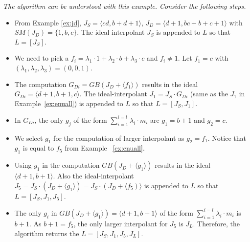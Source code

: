 \begin{Example}
\label{ex:chainofinter}
{\it
The algorithm can be understood with this example. Consider the following steps.
\begin{itemize}
	\item From Example \ref{ex:jd}, $J_S = \langle cd, b + d+ 1 \rangle$,
	$J_D = \langle d+1,bc+b+c+1 \rangle$ with $SM(J_D) = \{1,b,c\}$. The ideal-interpolant $J_S$
	is appended to $L$ so that $L = [J_S]$.
	
	\item We need to pick a $f_i = \lambda_1\cdot 1 + \lambda_2\cdot b + \lambda_3\cdot c$ and
	$f_i \neq 1$. Let $f_1 = c$ with $(\lambda_1,\lambda_2,\lambda_3) = (0,0,1)$.
	
	\item The computation $G_{Di} = GB(J_D + \langle f_1 \rangle)$ results in the ideal
	$G_{Di} = \langle d+1,b+1,c \rangle$. The ideal-interpolant $J_1 = J_S \cdot G_{Di}$ 
	(same as the $J_1$ in Example~\ref{ex:enuall}) is appended to 
	$L$ so that $L = [J_S,J_1]$.
	
	\item In $G_{Di}$, the only $g_j$ of the form $\sum_{i=1}^{i=l} \lambda_i \cdot m_i$ are
	$g_1 = b+1$ and $g_2 = c$. 

	\item We select $g_1$ for the computation of larger interpolant as $g_2 = f_1$. Notice that $g_1$ is equal to $f_5$ from Example ~\ref{ex:enuall}.
	
	\item Using $g_1$ in the computation $GB(J_D + \langle g_1 \rangle)$ results in the
	ideal $\langle d+1, b+1\rangle$. Also the ideal-interpolant $J_5 = J_S\cdot (J_D + \langle g_1 
	\rangle) = J_S\cdot (J_D + \langle f_5) \rangle$ is appended to $L$ so that $L = [J_S,J_1,J_5]$.
	
	\item The only $g_i$ in $GB(J_D + \langle g_1 \rangle) = \langle d+1, b+1\rangle$ of the 
	form $\sum_{i=1}^{i=l} \lambda_i \cdot m_i$ is $b+1$. As $b+1 = f_5$, the only larger
	interpolant for $J_5$ is $J_L$. Therefore, the algorithm returns the $L = [J_S,J_1,J_5,J_L]$.


\end{itemize}}
\end{Example}
